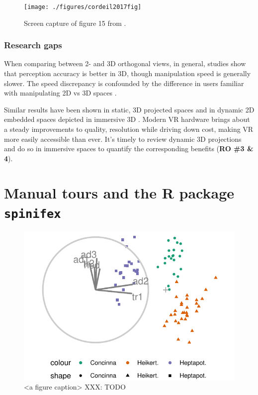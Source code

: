 \documentclass{monashthesis}
\begin{document}
\begin{figure}

{\centering \texttt{[image: ./figures/cordeil2017fig]} 

}

\caption{Screen capture of figure 15 from \textcite{cordeil_imaxes:_2017}.}\label{fig:cordeil2017fig}
\end{figure}

\hypertarget{research-gaps-1}{%
\subsection{Research gaps}\label{research-gaps-1}}

When comparing between 2- and 3D orthogonal views, in general, studies show that perception accuracy is better in 3D, though manipulation speed is generally slower. The speed discrepancy is confounded by the difference in users familiar with manipulating 2D vs 3D spaces \autocites{lee_effects_1986,wickens_implications_1994,tory_visualization_2006}[counterexample][]{sedlmair_empirical_2013}.

Similar results have been shown in static, 3D projected spaces \autocite{gracia_new_2016,wagner_filho_immersive_2018} and in dynamic 2D embedded spaces depicted in immersive 3D \autocite{nelson_xgobi_1998}. Modern VR hardware brings about a steady improvements to quality, resolution while driving down cost, making VR more easily accessible than ever. It's timely to review dynamic 3D projections and do so in immersive spaces to quantify the corresponding benefits (\textbf{RO \#3 \& 4}).

\hypertarget{ch:spinifex}{%
\chapter{\texorpdfstring{Manual tours and the R package \texttt{spinifex}}{Manual tours and the R package spinifex}}\label{ch:spinifex}}

\begin{figure}

{\centering \includegraphics[width=1\linewidth,]{./figures_from_script/ch3_fig1_biplot} 

}

\caption{<a figure caption> XXX: TODO}\label{fig:ch3fig1}
\end{figure}
\end{document}
